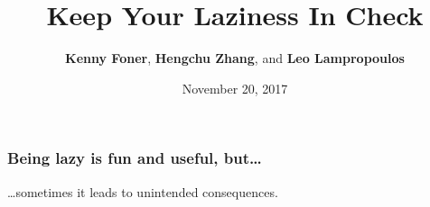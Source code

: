 \documentclass{beamer}
\title{Keep Your Laziness In Check}
\author{\textbf{Kenny Foner}, \textbf{Hengchu Zhang}, and \textbf{Leo Lampropoulos}}
\institute{University of Pennsylvania}
\date{November 20, 2017}
\begin{document}
\frame{\titlepage}

\begin{frame}
\frametitle{Being lazy is fun and useful, but\dots}
\Large\dots sometimes it leads to unintended consequences.
\end{frame}

\end{document}
